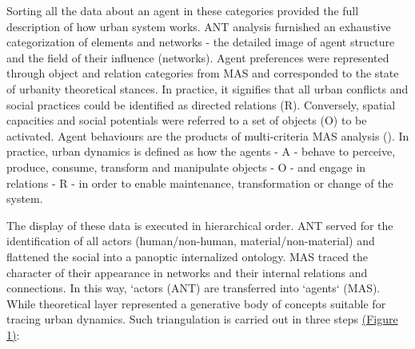 \documentclass[11pt]{report}
\begin{document}
Sorting all the data about an agent in these categories provided the full description of how urban system works. ANT analysis furnished an exhaustive categorization of elements and networks - the detailed image of agent structure and the field of their influence (networks). Agent preferences were represented through object and relation categories from MAS and corresponded to the state of urbanity theoretical stances. In practice, it signifies that all urban conflicts and social practices could be identified as directed relations (R). Conversely, spatial capacities and social potentials were referred to a set of objects (O) to be activated. Agent behaviours are the products of multi-criteria MAS analysis (\cite{Arsanjani et al. 2013}). In practice, urban dynamics is defined as how the agents - A - behave to perceive, produce, consume, transform and manipulate objects - O - and engage in relations - R - in order to enable maintenance, transformation or change of the system.

The display of these data is executed in hierarchical order. ANT served for the identification of all actors (human/non-human, material/non-material) and flattened the social into a panoptic internalized ontology. MAS traced the character of their appearance in networks and their internal relations and connections. In this way, `actors (ANT) are transferred into `agents` (MAS). While theoretical layer represented a generative body of concepts suitable for tracing urban dynamics. Such triangulation is carried out in three steps \href{}{(Figure 1)}:
\end{document}

